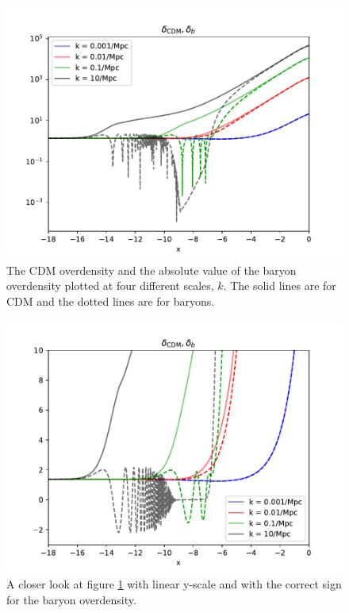\documentclass{aa}
\begin{document}
\begin{figure}[h!]
   \includegraphics[scale=0.6]{../figures/milestone3/delta_cdm_delta_b.pdf}
   \caption{The CDM overdensity and the absolute value of the baryon overdensity plotted at four different scales, $k$. The solid lines are for CDM and the dotted lines are for baryons.}\label{fig:delta_cdm_delta_b}
\end{figure}

\begin{figure}[h!]
   \includegraphics[scale=0.65]{../figures/milestone3/delta_cdm_delta_b_zoom.pdf}
   \caption{A closer look at figure \ref{fig:delta_cdm_delta_b} with linear y-scale and with the correct sign for the baryon overdensity.}\label{fig:delta_cdm_delta_b_zoom}
\end{figure}
\end{document}

